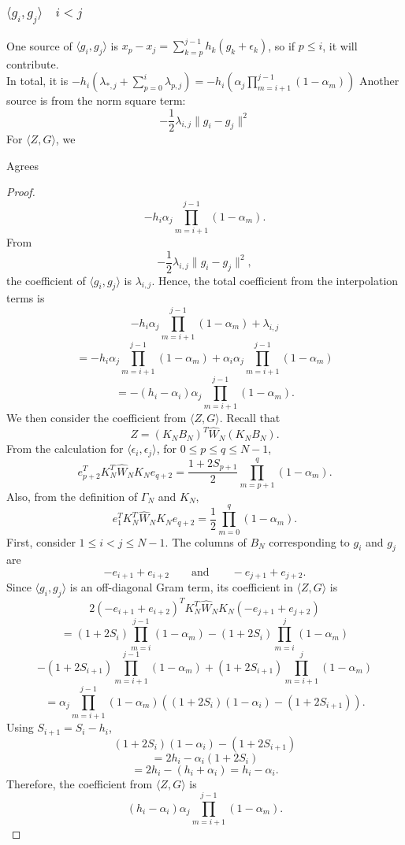 {\subsubsection{$\langle g_i, g_j \rangle \quad i<j$}
\begin{remark}
    One source of $\langle g_i, g_j \rangle$ is $x_p -x_j = \sum_{k=p}^{j-1}h_k(g_k+\epsilon_k)$, so if $p \le i$, it will contribute.\\
    In total, it is $-h_i(\lambda_{*,j}+ \sum_{p=0}^{i} \lambda_{p,j})=-h_i(\alpha_j \prod_{m=i+1}^{j-1}(1-\alpha_m))$
    Another source is from the norm square term: 
    \[-\frac{1}{2}\lambda_{i,j} \|g_i-g_j\|^2\]
    For $\langle Z,G \rangle$, we 
\end{remark}
\begin{lemma}
    Agrees
\end{lemma}
\begin{proof}
\[-h_i\alpha_j\prod_{m=i+1}^{j-1}(1-\alpha_m).\]
From\[-\frac{1}{2}\lambda_{i,j}\|g_i-g_j\|^2,\]
the coefficient of $\langle g_i,g_j\rangle$ is $\lambda_{i,j}$. Hence, the total coefficient from the interpolation terms is\[-h_i\alpha_j\prod_{m=i+1}^{j-1}(1-\alpha_m)+\lambda_{i,j}\]
\[=-h_i\alpha_j\prod_{m=i+1}^{j-1}(1-\alpha_m)+\alpha_i\alpha_j\prod_{m=i+1}^{j-1}(1-\alpha_m)\]
\[=-(h_i-\alpha_i)\alpha_j\prod_{m=i+1}^{j-1}(1-\alpha_m).\]
We then consider the coefficient from $\langle Z,G\rangle$.
Recall that
\[Z=(K_NB_N)^T\widehat{W}_N(K_NB_N).\]
From the calculation for $\langle \epsilon_i,\epsilon_j\rangle$, for
$0\le p\le q\le N-1$,\[e_{p+2}^T K_N^T\widehat{W}_NK_Ne_{q+2}=\frac{1+2S_{p+1}}{2}
\prod_{m=p+1}^{q}(1-\alpha_m).\]
Also, from the definition of $\Gamma_N$ and $K_N$,
\[e_1^T K_N^T\widehat{W}_NK_Ne_{q+2}=\frac{1}{2}\prod_{m=0}^{q}(1-\alpha_m).\]
First, consider $1\le i<j\le N-1$.
The columns of $B_N$ corresponding to $g_i$ and $g_j$ are
\[-e_{i+1}+e_{i+2}\qquad\text{and}\qquad-e_{j+1}+e_{j+2}.\]
Since $\langle g_i,g_j\rangle$ is an off-diagonal Gram term, its coefficient in
$\langle Z,G\rangle$ is
\[2(-e_{i+1}+e_{i+2})^T K_N^T\widehat{W}_NK_N (-e_{j+1}+e_{j+2})\]
\[=(1+2S_i)\prod_{m=i}^{j-1}(1-\alpha_m)-(1+2S_i)\prod_{m=i}^{j}(1-\alpha_m)\]
\[-(1+2S_{i+1})\prod_{m=i+1}^{j-1}(1-\alpha_m)+(1+2S_{i+1})\prod_{m=i+1}^{j}(1-\alpha_m)\]
\[=\alpha_j \prod_{m=i+1}^{j-1}(1-\alpha_m) \left((1+2S_i)(1-\alpha_i)-(1+2S_{i+1})\right).\]
Using $S_{i+1}=S_i-h_i$,
\[(1+2S_i)(1-\alpha_i)-(1+2S_{i+1})\]
\[=2h_i-\alpha_i(1+2S_i)\]
\[=2h_i-(h_i+\alpha_i)=h_i-\alpha_i.\]
Therefore, the coefficient from $\langle Z,G\rangle$ is
\[(h_i-\alpha_i)\alpha_j\prod_{m=i+1}^{j-1}(1-\alpha_m).\]

\end{proof}}

